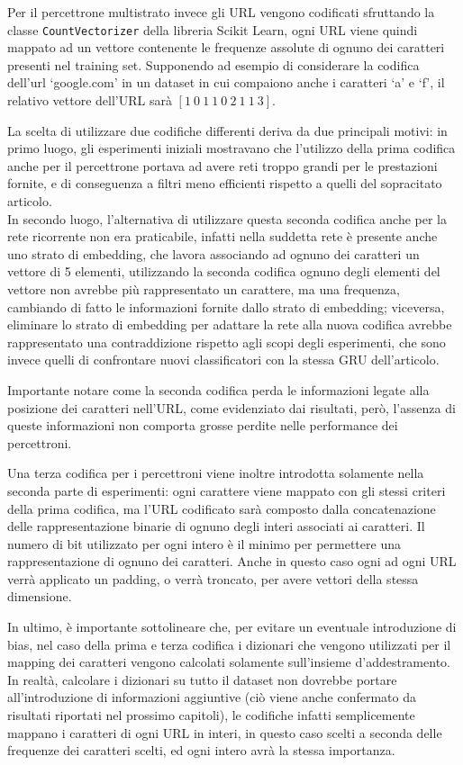 \documentclass[../../main.tex]{subfiles}
\begin{document}
    Per il percettrone multistrato invece gli URL vengono codificati sfruttando la classe \texttt{CountVectorizer} della libreria Scikit Learn, ogni URL viene quindi mappato ad un vettore contenente le frequenze assolute di ognuno dei caratteri presenti nel training set. Supponendo ad esempio di considerare la codifica dell'url `google.com' in un dataset in cui compaiono anche i caratteri `a' e `f', il relativo vettore dell'URL sarà $[1 \ 0 \ 1 \ 1 \ 0 \ 2 \ 1 \ 1 \ 3]$.

    La scelta di utilizzare due codifiche differenti deriva da due principali motivi: in primo luogo, gli esperimenti iniziali mostravano che l'utilizzo della prima codifica anche per il percettrone portava ad avere reti troppo grandi per le prestazioni fornite, e di conseguenza a filtri meno efficienti rispetto a quelli del sopracitato articolo.\\
    In secondo luogo, l'alternativa di utilizzare questa seconda codifica anche per la rete ricorrente non era praticabile, infatti nella suddetta rete è presente anche uno strato di embedding, che lavora associando ad ognuno dei caratteri un vettore di 5 elementi, utilizzando la seconda codifica ognuno degli elementi del vettore non avrebbe più rappresentato un carattere, ma una frequenza, cambiando di fatto le informazioni fornite dallo strato di embedding; viceversa, eliminare lo strato di embedding per adattare la rete alla nuova codifica avrebbe rappresentato una contraddizione rispetto agli scopi degli esperimenti, che sono invece quelli di confrontare nuovi classificatori con la stessa GRU dell'articolo.

    Importante notare come la seconda codifica perda le informazioni legate alla posizione dei caratteri nell'URL, come evidenziato dai risultati, però, l'assenza di queste informazioni non comporta grosse perdite nelle performance dei percettroni.

    Una terza codifica per i percettroni viene inoltre introdotta solamente nella seconda parte di esperimenti: ogni carattere viene mappato con gli stessi criteri della prima codifica, ma l'URL codificato sarà composto dalla concatenazione delle rappresentazione binarie di ognuno degli interi associati ai caratteri. Il numero di bit utilizzato per ogni intero è il minimo per permettere una rappresentazione di ognuno dei caratteri. Anche in questo caso ogni ad ogni URL verrà applicato un padding, o verrà troncato, per avere vettori della stessa dimensione.

    In ultimo, è importante sottolineare che, per evitare un eventuale introduzione di bias, nel caso della prima e terza codifica i dizionari che vengono utilizzati per il mapping dei caratteri vengono calcolati solamente sull'insieme d'addestramento. In realtà, calcolare i dizionari su tutto il dataset non dovrebbe portare all'introduzione di informazioni aggiuntive (ciò viene anche confermato da risultati riportati nel prossimo capitoli), le codifiche infatti semplicemente mappano i caratteri di ogni URL in interi, in questo caso scelti a seconda delle frequenze dei caratteri scelti, ed ogni intero avrà la stessa importanza.
\end{document}
